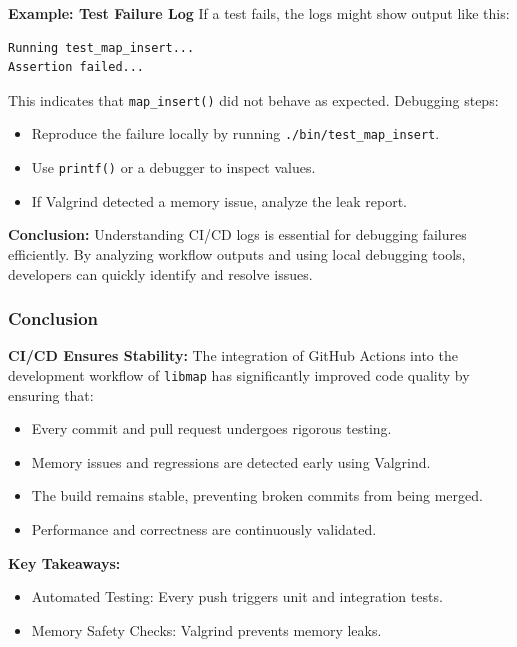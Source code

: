 \documentclass[titlepage]{article}
\begin{document}
\textbf{Example: Test Failure Log}  
If a test fails, the logs might show output like this:

\begin{verbatim}
Running test_map_insert...
Assertion failed...
\end{verbatim}

This indicates that \texttt{map\_insert()} did not behave as expected. Debugging steps:
\begin{itemize}
    \item Reproduce the failure locally by running \texttt{./bin/test\_map\_insert}.
    \item Use \texttt{printf()} or a debugger to inspect values.
    \item If Valgrind detected a memory issue, analyze the leak report.
\end{itemize}

\textbf{Conclusion:}  
Understanding CI/CD logs is essential for debugging failures efficiently. By analyzing workflow outputs and using local debugging tools, developers can quickly identify and resolve issues.



\subsubsection{Conclusion}

\textbf{CI/CD Ensures Stability:}  
The integration of GitHub Actions into the development workflow of \texttt{libmap} has significantly improved code quality by ensuring that:

\begin{itemize}
    \item Every commit and pull request undergoes rigorous testing.
    \item Memory issues and regressions are detected early using Valgrind.
    \item The build remains stable, preventing broken commits from being merged.
    \item Performance and correctness are continuously validated.
\end{itemize}

\textbf{Key Takeaways:}
\begin{itemize}
    \item Automated Testing: Every push triggers unit and integration tests.
    \item Memory Safety Checks: Valgrind prevents memory leaks.
\end{itemize}
\end{document}
